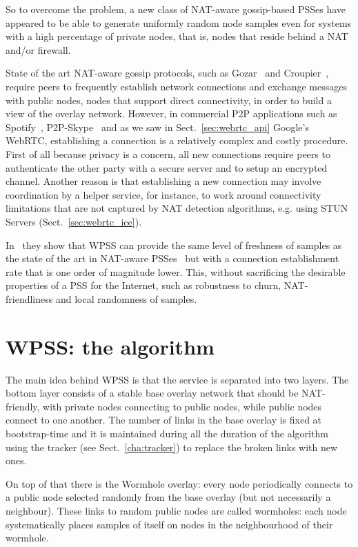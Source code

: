 So to overcome the problem, a new class of NAT-aware gossip-based PSSes have appeared to be able to generate uniformly random node samples even for systems with a high percentage of private nodes, that is, nodes that reside behind a NAT and/or firewall.

State of the art NAT-aware gossip protocols, such as Gozar~\cite{gozar} and Croupier~\cite{croupier}, require peers to frequently establish network connections and exchange messages with public nodes, nodes that support direct connectivity, in order to build a view of the overlay network. However, in commercial P2P applications such as Spotify~\cite{spotify}, P2P-Skype~\cite{skype} and as we saw in Sect.~\ref{sec:webrtc_api} Google’s WebRTC, establishing a connection is a relatively complex and costly procedure. First of all because privacy is a concern, all new connections require peers to authenticate the other party with a secure server and to setup an encrypted channel. Another reason is that establishing a new connection may involve coordination by a helper service, for instance, to work around connectivity limitations that are not captured by NAT detection algorithms, e.g. using STUN Servers (Sect.~\ref{sec:webrtc_ice}). 

In~\cite{wormhole} they show that \ac{WPSS} can provide the same level of freshness of samples as the state of the art in NAT-aware PSSes~\cite{croupier} but with a connection establishment rate that is one order of magnitude lower. This, without sacrificing the desirable properties of a PSS for the Internet, such as robustness to churn, NAT-friendliness and local randomness of samples.

\section{WPSS: the algorithm}
\label{sec:wpss_algorithm}
The main idea behind \ac{WPSS} is that the service is separated into two layers. The bottom layer consists of a stable base overlay network that should be NAT-friendly, with private nodes connecting to public nodes, while public nodes connect to one another. The number of links in the base overlay is fixed at bootstrap-time and it is maintained during all the duration of the algorithm using the tracker (see Sect.~\ref{cha:tracker}) to replace the broken links with new ones.

On top of that there is the Wormhole overlay: every node periodically connects to a public node selected randomly from the base overlay (but not necessarily a neighbour). These links to random public nodes are called wormholes: each node systematically places samples of itself on nodes in the neighbourhood of their wormhole. 

